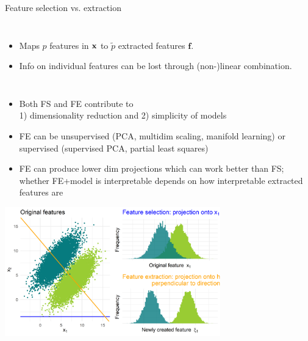 \documentclass[11pt,compress,t,notes=noshow, xcolor=table]{beamer}
\begin{document}
\begin{vbframe}{Feature selection vs. extraction}
\begin{columns}
      \smallskip

      \begin{itemize}
        \item Maps $p$ features in $\mathbf{x}$ to $\tilde{p}$ extracted features $\bm{f}$.
        \item Info on individual features can be lost through (non-)linear combination.
      \end{itemize}

    \end{columns}


    \framebreak

    
    \begin{itemize}
    \footnotesize
        \item Both FS and FE contribute to\\ 1) dimensionality reduction and 2) simplicity of models
        \item FE can be unsupervised (PCA, multidim scaling, manifold learning) or supervised (supervised PCA, partial least squares)        
        \item FE can produce lower dim projections which can work better than FS; whether FE+model is interpretable depends on how interpretable extracted features are
    \end{itemize}

    \vspace{0.2cm}


    \begin{center}
     \includegraphics[width = 0.7\textwidth]{figure_man/feature_sel_vs_extr.png}\\
    \end{center}


  \end{vbframe}
\end{document}
